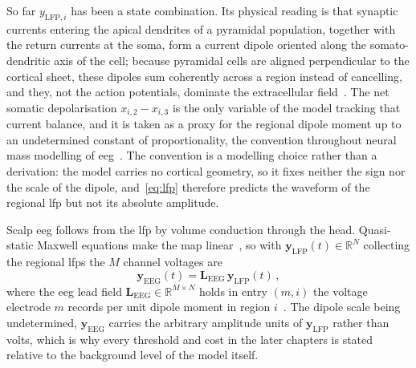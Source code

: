 So far $y_{\mathrm{LFP},i}$ has been a state combination. Its physical reading is that
synaptic currents entering the apical dendrites of a pyramidal population, together with
the return currents at the soma, form a current dipole oriented along the somato-dendritic
axis of the cell; because pyramidal cells are aligned perpendicular to the cortical
sheet, these dipoles sum coherently across a region instead of cancelling, and they, not
the action potentials, dominate the extracellular field~\cite{Buzsaki2012}. The net somatic depolarisation $x_{i,2} - x_{i,3}$ is the only variable of the model tracking %
that current balance, and it is taken as a proxy for the regional dipole moment up to an
undetermined constant of proportionality, the convention throughout neural mass modelling
of \ac{eeg}~\cite{David2003,SanzLeon2015}. The convention is a modelling choice rather %
than a derivation: the model carries no cortical geometry, so it fixes neither the sign
nor the scale of the dipole, and~\eqref{eq:lfp} therefore predicts the waveform of the
regional \ac{lfp} but not its absolute amplitude.

Scalp \ac{eeg} follows from the \ac{lfp} by volume conduction through the head. Quasi-static
Maxwell equations make the map linear~\cite{Buzsaki2012}, so with %
$\mathbf{y}_\mathrm{LFP}(t) \in \mathbb{R}^{N}$ collecting the regional \acp{lfp} the $M$
channel voltages are
%
\begin{equation}
    \mathbf{y}_\mathrm{EEG}(t) = \mathbf{L}_\mathrm{EEG}\, \mathbf{y}_\mathrm{LFP}(t) \,,
    \label{eq:eeg}
\end{equation}
%
where the \ac{eeg} lead field $\mathbf{L}_\mathrm{EEG} \in \mathbb{R}^{M \times N}$ holds in
entry $(m,i)$ the voltage electrode $m$ records per unit dipole moment in region $i$~\cite{SanzLeon2015}. The dipole scale being undetermined, $\mathbf{y}_\mathrm{EEG}$ carries %
the arbitrary amplitude units of $\mathbf{y}_\mathrm{LFP}$ rather than volts, which is why
every threshold and cost in the later chapters is stated relative to the background level
of the model itself.

